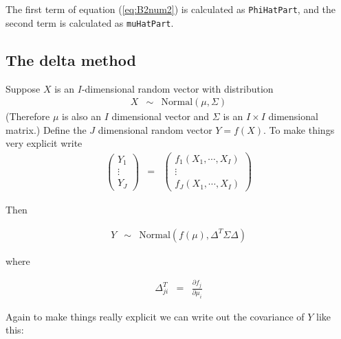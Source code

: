 \documentclass[11pt]{article}
\begin{document}
The first term of equation (\ref{eq:B2num2}) is calculated as
\texttt{PhiHatPart}, and the second term is calculated as
\texttt{muHatPart}. 

\subsection{The delta method}
Suppose $X$ is an $I$-dimensional random vector with distribution
\begin{eqnarray}
X & \sim & \mbox{Normal}(\mu, \Sigma)
\end{eqnarray}
(Therefore $\mu$ is also an $I$ dimensional vector and $\Sigma$ is an
$I \times I$ dimensional matrix.)
Define the $J$ dimensional random vector $Y = f(X)$. 
To make things very explicit
write
\begin{eqnarray}
\left( 
\begin{array}{l}
       Y_1 \\
       \vdots \\
       Y_J
\end{array} 
\right) 
             & = & 
                  \left ( 
                    \begin{array}{l}
                        f_1(X_1, \cdots, X_I)\\
                        \vdots \\
                        f_J(X_1, \cdots, X_I)  
                    \end{array}
                  \right)
\end{eqnarray}

Then 

\begin{eqnarray}
Y & \sim & \mbox{Normal}(f(\mu), \Delta^T \Sigma \Delta)
\label{eq:eqnYNormal}
\end{eqnarray}

where 

\begin{eqnarray}
\Delta^T_{ji} & = & \frac{\partial f_j}{\partial \mu_i}
\end{eqnarray}

Again to make things really explicit we can write out the covariance
of $Y$ like this:
\end{document}
